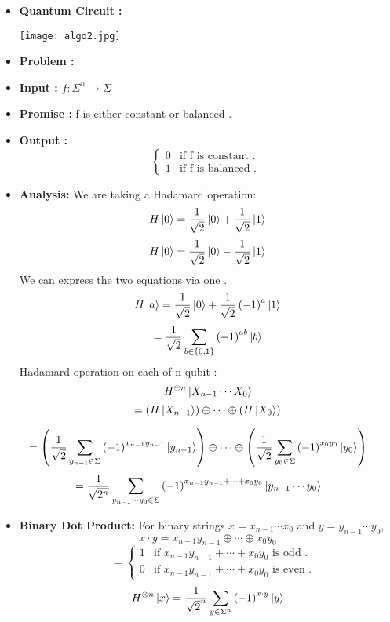 \documentclass[12pt]{beamer}
\begin{document}
\begin{frame}
\begin{itemize}
\item\textbf {Quantum Circuit :}
 \begin{center}
        \texttt{[image: algo2.jpg]}
    \end{center}
\item\textbf{Problem :}
\item\textbf{Input : } $f: \Sigma^n \rightarrow \Sigma$
\item\textbf{Promise :} f is either constant or balanced .
\item\textbf{Output :}  
\[
\begin{cases}
    0 & \text{if f is constant . } \\
    1 & \text{if f is balanced . }
\end{cases}
\]
\end{itemize}
\end{frame}
\begin{frame}
\begin{itemize}
\item \textbf{Analysis:}
    We are taking a Hadamard operation:
    \[
    H\ket{0} = \frac{1}{\sqrt{2}} \ket{0} + \frac{1}{\sqrt{2}} \ket{1}
    \]
    \[
    H\ket{0} = \frac{1}{\sqrt{2}} \ket{0} - \frac{1}{\sqrt{2}} \ket{1}
    \]
    We can express the two equations via one .
 \[
   H\ket{a} = \frac{1}{\sqrt{2}} \ket{0} + \frac{1}{\sqrt{2}}\left(-1\right)^a \ket{1}
 \]
\[
 =\frac{1}{\sqrt{2}}\sum_{b\in\{0,1\}} \left(-1\right)^{ab}\ket{b}
\]
Hadamard operation on each of n qubit :
\[
H^{\oplus n}\ket{X_{n-1}\cdots X_0}
\]
\[
=\left(H\ket{X_{n-1}}\right)\oplus\cdots\oplus\left(H\ket{X_0}\right)
\]
\end{itemize}
\end{frame}
\begin{frame}
\[
= \left(\frac{1}{\sqrt{2}}\sum_{y_{n-1}\in\Sigma} \left(-1\right)^{x_{n-1}y_{n-1}}\ket{y_{n-1}}\right) \oplus \cdots \oplus \left(\frac{1}{\sqrt{2}}\sum_{y_{0}\in\Sigma} \left(-1\right)^{x_{0}y_{0}}\ket{y_{0}}\right)
\]
\[
= \frac{1}{\sqrt{2^n}}\sum_{y_{n-1}\cdots y_{0}\in\Sigma} \left(-1\right)^{x_{n-1}y_{n-1}+\cdots+x_{0}y_{0}}\ket{y_{n-1}\cdots y_{0}}
\]
\begin{itemize}
\item \textbf{Binary Dot Product:}
For binary strings \(x = x_{n-1}\cdots x_{0}\) and \(y = y_{n-1}\cdots y_{0}\),
\[
x\cdot y=x_{n-1}y_{n-1}\oplus\cdots\oplus x_{0}y_{0}
\]
\[
\quad=
\begin{cases}
    1 & \text{if  }x_{n-1}y_{n-1}+\cdots+x_{0}y_{0}\text{  is odd .} \\
    0 & \text{if  }x_{n-1}y_{n-1}+\cdots+x_{0}y_{0}\text{  is even .} 
\end{cases}
\]
\[
H^{\otimes n}\ket{x}=\frac{1}{\sqrt{2}^n}\sum_{y\in\Sigma^n}\left(-1\right)^{x\cdot y}\ket{y}
\]
\end{itemize}
\end{frame}
\end{document}
